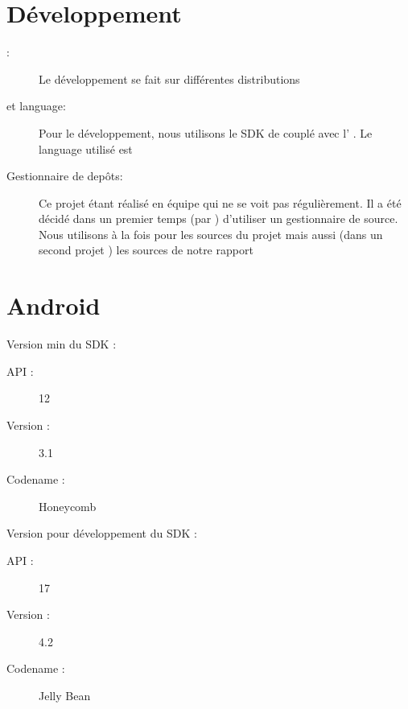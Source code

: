 \documentclass[french]{report}
\begin{document}
\section{Développement}
\begin{description}
\item[\os{}: ] Le développement se fait sur différentes distributions \linux{}
\item[\ide{} et language: ] Pour le développement, nous utilisons le SDK de \android{} couplé avec l'\ide{} \eclipse{}. Le language utilisé est \java{}
\item[Gestionnaire de depôts: ] Ce projet étant réalisé en équipe qui ne se voit pas régulièrement. Il a été décidé dans un premier temps (par \responsableProjet{}) d'utiliser un gestionnaire de source. Nous utilisons \github{} à la fois pour les sources du projet mais aussi (dans un second projet \github{}) les sources de notre rapport
\end{description}

\section{Android}
Version min du SDK :
\begin{description}
\item[API : ] 12
\item[Version : ] 3.1 
\item[Codename : ] Honeycomb 
\end{description}

Version pour développement du SDK :
\begin{description}
\item[API : ] 17
\item[Version : ] 4.2 
\item[Codename : ] Jelly Bean
\end{description}


\end{document}
